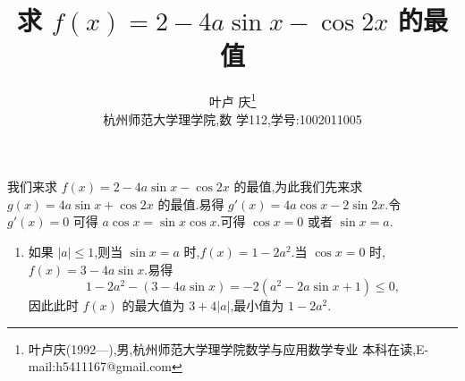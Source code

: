 \documentclass[a4paper]{article}
\begin{document}
\title{\huge{\bf{求 $f(x)=2-4a\sin x-\cos 2x$ 的最值}}} \author{\small{叶卢
    庆\footnote{叶卢庆(1992---),男,杭州师范大学理学院数学与应用数学专业
      本科在读,E-mail:h5411167@gmail.com}}\\{\small{杭州师范大学理学院,数
      学112,学号:1002011005}}}
\maketitle
我们来求 $f(x)=2-4a\sin x-\cos 2x$ 的最值,为此我们先来求 $g(x)=4a\sin
x+\cos 2x$ 的最值.易得 $g'(x)=4a\cos x-2\sin 2x$.令 $g'(x)=0$ 可得
$a\cos x=\sin x\cos x$.可得 $\cos x=0$ 或者 $\sin x=a$.\\
\begin{enumerate}
 $|a|>1$,则只能是 $\cos x=0$,则 $f(x)=2-4a\sin
x-(2\cos^2x-1)=3-4a\sin x$.此时 $f(x)$ 的最大值为 $3+4|a|$,最小值为
$3-4|a|$.
\item
如果 $|a|\leq 1$,则当 $\sin x=a$ 时,$f(x)=1-2a^2$.当 $\cos x=0$
时,$f(x)=3-4a\sin x$.易得
$$
1-2a^2-(3-4a\sin x)=-2(a^2-2a\sin x+1)\leq 0,
$$
因此此时 $f(x)$ 的最大值为 $3+4|a|$,最小值为 $1-2a^2$.
\end{enumerate}
\end{document}

